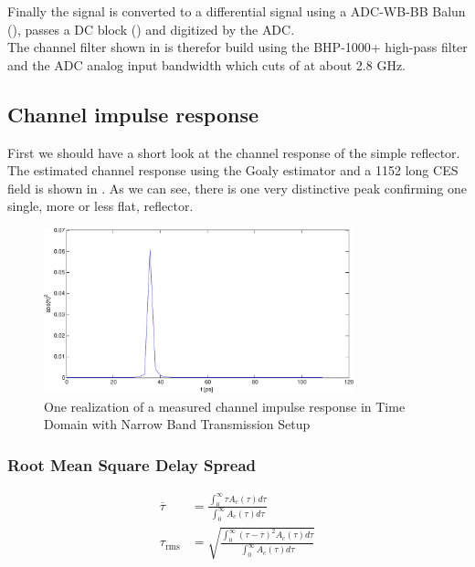 Finally the signal is converted to a differential signal using a ADC-WB-BB Balun
(), passes a \gls{DC} block ()
and digitized by the \gls{ADC}. \\

The channel filter shown in  is therefor build using
the BHP-1000+ high-pass filter and the \gls{ADC} analog input bandwidth which
cuts of at about 2.8 GHz. \\

\subsection{Channel impulse response}
\label{sec:res_450_h}
First we should have a short look at the channel response of the simple
reflector. The estimated channel response using the Goaly estimator and a
1152 long \gls{CES} field is shown in .
As we can see, there is one very distinctive peak confirming one single,
more or less flat, reflector. \\

\begin{figure}[p]
  \centering
  \includegraphics[width=0.8\textwidth]{figures/matlab/res_450_h}
  \caption{One realization of a measured channel impulse response in Time Domain
    with Narrow Band Transmission Setup}
  \label{fig:res_450_h}
\end{figure}

\subsubsection{Root Mean Square Delay Spread}
\begin{align}
  \overline{\tau} &=\frac{\int_0^\infty\tau A_c(\tau)d\tau}{\int_0^\infty A_c(\tau)d\tau} \\
  \tau_{\text{rms}} &=\sqrt{\frac{\int_0^\infty(\tau-\overline{\tau})^2
      A_c(\tau)d\tau}{\int_0^\infty A_c(\tau)d\tau}}
\end{align}

